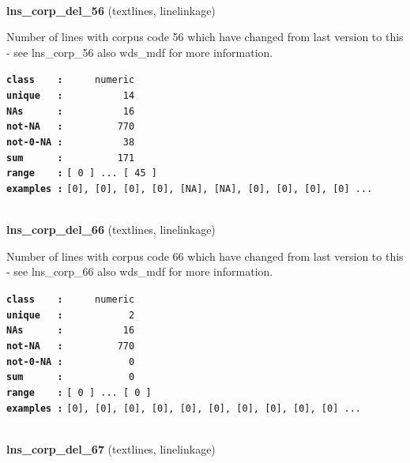 \documentclass[]{article}
\begin{document}
~

\textbf{lns\_corp\_del\_56} (textlines, linelinkage)

Number of lines with corpus code 56 which have changed from last version
to this - see lns\_corp\_56 also wds\_mdf for more information.

\textbf{\texttt{class\ \ \ \ :}} \texttt{~~~~~numeric}\\
\textbf{\texttt{unique\ \ \ :}} \texttt{~~~~~~~~~~14}\\
\textbf{\texttt{NAs\ \ \ \ \ \ :}} \texttt{~~~~~~~~~~16}\\
\textbf{\texttt{not-NA\ \ \ :}} \texttt{~~~~~~~~~770}\\
\textbf{\texttt{not-0-NA\ :}} \texttt{~~~~~~~~~~38}\\
\textbf{\texttt{sum\ \ \ \ \ \ :}} \texttt{~~~~~~~~~171}\\
\textbf{\texttt{range\ \ \ \ :}}
\texttt{{[}\ 0\ {]}\ ...\ {[}\ 45\ {]}}\\
\textbf{\texttt{examples\ :}}
\texttt{{[}0{]},\ {[}0{]},\ {[}0{]},\ {[}0{]},\ {[}NA{]},\ {[}NA{]},\ {[}0{]},\ {[}0{]},\ {[}0{]},\ {[}0{]}\ ...}\\

~

\textbf{lns\_corp\_del\_66} (textlines, linelinkage)

Number of lines with corpus code 66 which have changed from last version
to this - see lns\_corp\_66 also wds\_mdf for more information.

\textbf{\texttt{class\ \ \ \ :}} \texttt{~~~~~numeric}\\
\textbf{\texttt{unique\ \ \ :}} \texttt{~~~~~~~~~~~2}\\
\textbf{\texttt{NAs\ \ \ \ \ \ :}} \texttt{~~~~~~~~~~16}\\
\textbf{\texttt{not-NA\ \ \ :}} \texttt{~~~~~~~~~770}\\
\textbf{\texttt{not-0-NA\ :}} \texttt{~~~~~~~~~~~0}\\
\textbf{\texttt{sum\ \ \ \ \ \ :}} \texttt{~~~~~~~~~~~0}\\
\textbf{\texttt{range\ \ \ \ :}}
\texttt{{[}\ 0\ {]}\ ...\ {[}\ 0\ {]}}\\
\textbf{\texttt{examples\ :}}
\texttt{{[}0{]},\ {[}0{]},\ {[}0{]},\ {[}0{]},\ {[}0{]},\ {[}0{]},\ {[}0{]},\ {[}0{]},\ {[}0{]},\ {[}0{]}\ ...}\\

~

\textbf{lns\_corp\_del\_67} (textlines, linelinkage)
\end{document}

